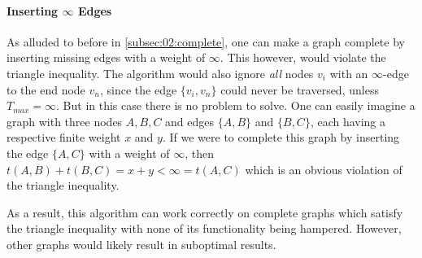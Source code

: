 \paragraph{Inserting $\infty$ Edges} 
As alluded to before in \cref{subsec:02:complete}, one can make a graph complete by inserting missing edges with a weight of $\infty$.
This however, would violate the triangle inequality.
The algorithm would also ignore \emph{all} nodes $v_i$ with an $\infty$-edge to the end node $v_n$, since the edge $\{v_i, v_n\}$ could never be traversed, unless $T_{max} = \infty$.
But in this case there is no problem to solve.
One can easily imagine a graph with three nodes $A, B, C$ and edges $\{A, B\}$ and $\{B, C\}$, each having a respective finite weight $x$ and $y$.
If we were to complete this graph by inserting the edge $\{A, C\}$ with a weight of $\infty$, then $t(A, B) + t(B,C) = x + y < \infty = t(A, C)$
which is an obvious violation of the triangle inequality.

As a result, this algorithm can work correctly on complete graphs which satisfy the triangle inequality with none of its functionality being hampered.
However, other graphs would likely result in suboptimal results. 
